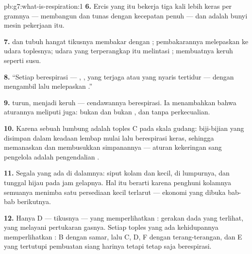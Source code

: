 \begin{solution}{pb:g7:what-is-respiration:1}
\textbf{6.} Ercis yang  itu bekerja tiga kali lebih keras
per gramnya --- membangun  dan tunas dengan kecepatan penuh ---
dan  adalah bunyi mesin pekerjaan itu.

\textbf{7.}  dan tubuh hangat tikusnya membakar  dengan
; pembakarannya melepaskan  ke udara toplesnya;
udara yang terperangkap itu melintasi ; 
membuatnya keruh seperti susu.

\textbf{8.} ``Setiap  berespirasi --- , ,
 yang terjaga atau yang nyaris tertidur --- dengan mengambil
 lalu melepaskan .''

\textbf{9.}  turun,  menjadi keruh ---
cendawannya berespirasi. Ia menambahkan bahwa aturannya meliputi 
juga: bukan  dan bukan , dan tanpa perkecualian.

\textbf{10.} Karena sebuah lumbung adalah toples C pada skala gudang:
biji-bijian yang disimpan dalam keadaan lembap mulai  lalu
berespirasi keras, sehingga memanaskan dan membusukkan simpanannya ---
aturan kekeringan sang pengelola adalah pengendalian .

\textbf{11.} Segala yang ada di dalamnya: siput kolam dan  kecil,
 di lumpurnya,  dan  tunggal hijau pada jam
gelapnya. Hal itu berarti karena penghuni kolamnya semuanya menimba
satu persediaan kecil  terlarut --- ekonomi yang dibuka
bab-bab berikutnya.

\textbf{12.} Hanya D --- tikusnya --- yang memperlihatkan :
gerakan dada yang terlihat, yang melayani pertukaran gasnya. Setiap
toples yang ada kehidupannya memperlihatkan : B dengan samar,
lalu C, D, F dengan terang-terangan, dan E yang tertutupi pembuatan
siang harinya tetapi tetap saja berespirasi.
\end{solution}

